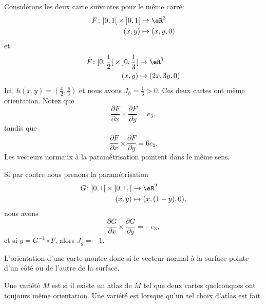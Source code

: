 Considérons les deux carte suivantes pour le même carré:
\begin{equation}
	\begin{aligned}
		F\colon\mathopen] 0 , 1 \mathclose[\times \mathopen] 0 , 1 \mathclose[ &\to \eR^3 \\
		(x,y)&\mapsto (x,y,0) 
	\end{aligned}
\end{equation}
et
\begin{equation}
	\begin{aligned}
		\tilde F\colon\mathopen] 0 , \frac{ 1 }{2} \mathclose[\times\mathopen] 0 , \frac{1}{ 3 } \mathclose[ &\to \eR^3 \\
		(x,y)&\mapsto (2x,3y,0) 
	\end{aligned}
\end{equation}
Ici, $h(x,y)=\left( \frac{ x }{ 2 },\frac{ y }{ 3 } \right)$ et nous avons $J_h=\frac{1}{ 6 }>0$. Ces deux cartes ont même orientation. Notez que
\begin{equation}
	\frac{ \partial F }{ \partial x }\times\frac{ \partial F }{ \partial y }=e_3,
\end{equation}
tandis que
\begin{equation}
	\frac{ \partial \tilde F }{ \partial x }\times\frac{ \partial \tilde F }{ \partial y }=6e_3.
\end{equation}
Les vecteurs normaux à la paramétrisation pointent dans le même sens.

Si par contre nous prenons la paramétrisation
\begin{equation}
	\begin{aligned}
		G\colon \mathopen] 0,1 \mathclose[\times\mathopen] 0,1 ,  \mathclose[&\to \eR^2 \\
		(x,y)&\mapsto (x,(1-y),0), 
	\end{aligned}
\end{equation}
nous avons
\begin{equation}
	\frac{ \partial G }{ \partial x }\times\frac{ \partial G }{ \partial y }=-e_3,
\end{equation}
et si $g=G^{-1}\circ F$, alors $J_g=-1$.

L'orientation d'une carte montre donc si le vecteur normal à la surface pointe d'un côté ou de l'autre de la surface.

\begin{definition}
	Une variété $M$ est  si il existe un atlas de $M$ tel que deux cartes quelconques ont toujours même orientation. Une variété est  lorsque qu'un tel choix d'atlas est fait.
\end{definition}

